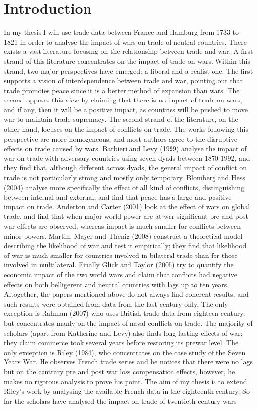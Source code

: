 \documentclass[12pt,a4paper,titlepage,english]{article}
\begin{document}
\section{Introduction}
In my thesis I will use trade data between France and Hamburg from 1733 to 1821 in order to analyse the impact of wars on trade of neutral countries. There exists a vast literature focusing on the relationship between trade and war. A first strand of this literature concentrates on the impact of trade on wars. Within this strand, two major perspectives have emerged: a liberal and a realist one. The first supports a vision of interdependence between trade and war, pointing out that trade promotes peace since it is a better method of expansion than wars. The second opposes this view by claiming that there is no impact of trade on wars, and if any, then it will be a positive impact, as countries will be pushed to move war to maintain trade supremacy. The second strand of the literature, on the other hand, focuses on the impact of conflicts on trade. The works following this perspective are more homogeneous, and most authors agree to the disruptive effects on trade caused by wars. Barbieri and Levy (1999) analyse the impact of war on trade with adversary countries using seven dyads between 1870-1992, and they find that, although different across dyads, the general impact of conflict on trade is not particularly strong and mostly only temporary. Blomberg and Hess (2004) analyse more specifically the effect of all kind of conflicts, distinguishing between internal and external, and find that peace has a large and positive impact on trade. Anderton and Carter (2001) look at the effect of wars on global trade, and find that when major world power are at war significant pre and post war effects are observed, whereas impact is much smaller for conflicts between minor powers. Martin, Mayer and Thenig (2008) construct a theoretical model describing the likelihood of war and test it empirically; they find that likelihood of war is much smaller for countries involved in bilateral trade than for those involved in multilateral. Finally Glick and Taylor (2005) try to quantify the economic impact of the two world wars and claim that conflicts had negative effects on both belligerent and neutral countries with lags up to ten years. Altogether, the papers mentioned above do not always find coherent results, and such results were obtained from data from the last century only. The only exception is Rahman (2007) who uses British trade data from eighteen century, but concentrates manly on the impact of naval conflicts on trade. The majority of scholars (apart from Katherine and Levy) also finds long lasting effects of war; they claim commerce took several years before restoring its prewar level. The only exception is Riley (1984), who concentrates on the case study of the Seven Years War. He observes French trade series and he notices that there were no lags but on the contrary pre and post war loss compensation effects, however, he makes no rigorous analysis to prove his point. The aim of my thesis is to extend Riley’s work by analysing the available French data in the eighteenth century. So far the scholars have analysed the impact on trade of twentieth century wars 
\end{document}
